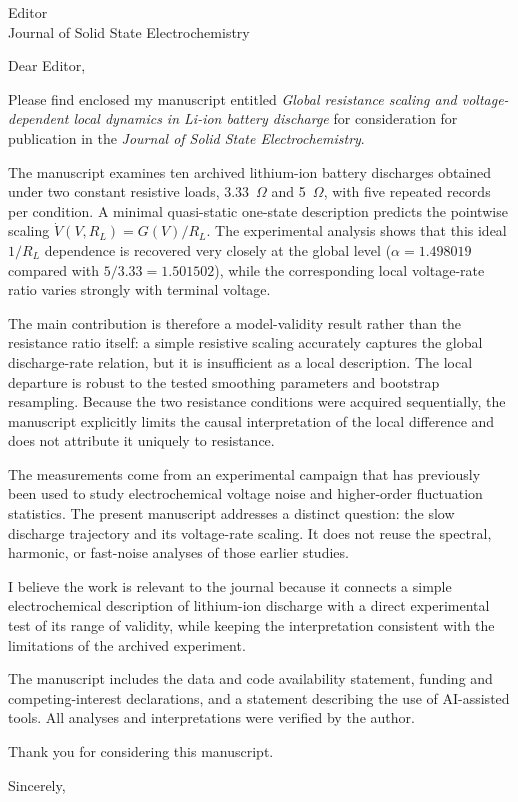 \documentclass[11pt,a4paper]{letter}
\begin{document}
\begin{letter}{Editor\\Journal of Solid State Electrochemistry}

\opening{Dear Editor,}

Please find enclosed my manuscript entitled
\emph{Global resistance scaling and voltage-dependent local dynamics in Li-ion battery discharge}
for consideration for publication in the \emph{Journal of Solid State Electrochemistry}.

The manuscript examines ten archived lithium-ion battery discharges obtained
under two constant resistive loads, 3.33~$\Omega$ and 5~$\Omega$, with five
repeated records per condition. A minimal quasi-static one-state description
predicts the pointwise scaling
$\dot V(V,R_L)=G(V)/R_L$. The experimental analysis shows that this ideal
$1/R_L$ dependence is recovered very closely at the global level
($\alpha=1.498019$ compared with $5/3.33=1.501502$), while the corresponding
local voltage-rate ratio varies strongly with terminal voltage.

The main contribution is therefore a model-validity result rather than the
resistance ratio itself: a simple resistive scaling accurately captures the
global discharge-rate relation, but it is insufficient as a local description.
The local departure is robust to the tested smoothing parameters and bootstrap
resampling. Because the two resistance conditions were acquired sequentially,
the manuscript explicitly limits the causal interpretation of the local
difference and does not attribute it uniquely to resistance.

The measurements come from an experimental campaign that has previously been
used to study electrochemical voltage noise and higher-order fluctuation
statistics. The present manuscript addresses a distinct question: the slow
discharge trajectory and its voltage-rate scaling. It does not reuse the
spectral, harmonic, or fast-noise analyses of those earlier studies.

I believe the work is relevant to the journal because it connects a simple
electrochemical description of lithium-ion discharge with a direct experimental
test of its range of validity, while keeping the interpretation consistent with
the limitations of the archived experiment.

The manuscript includes the data and code availability statement, funding and
competing-interest declarations, and a statement describing the use of
AI-assisted tools. All analyses and interpretations were verified by the author.

Thank you for considering this manuscript.

\closing{Sincerely,}

\end{letter}
\end{document}
